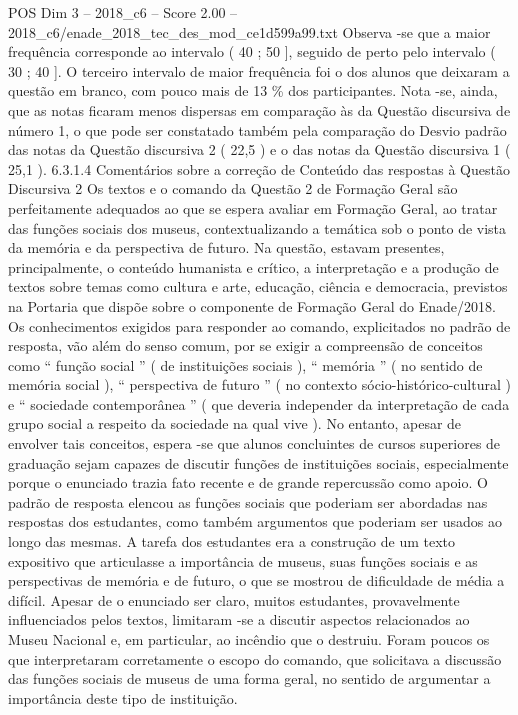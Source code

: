 \begin{textsample}{POS Dim 3 – 2018\_c6 – Score 2.00 – 2018\_c6/enade\_2018\_tec\_des\_mod\_ce1d599a99.txt}
Observa -se que a maior frequência corresponde ao intervalo ( 40 ; 50 ], seguido de perto pelo intervalo ( 30 ; 40 ].
O terceiro intervalo de maior frequência foi o dos alunos que deixaram a questão em branco, com pouco mais de 13 \% dos participantes.
Nota -se, ainda, que as notas ficaram menos dispersas em comparação às da Questão discursiva de número 1, o que pode ser constatado também pela comparação do Desvio padrão das notas da Questão discursiva 2 ( 22,5 ) e o das notas da Questão discursiva 1 ( 25,1 ). 6.3.1.4 Comentários sobre a correção de Conteúdo das respostas à Questão Discursiva 2 Os textos e o comando da Questão 2 de Formação Geral são perfeitamente adequados ao que se espera avaliar em Formação Geral, ao tratar das funções sociais dos museus, contextualizando a temática sob o ponto de vista da memória e da perspectiva de futuro.
Na questão, estavam presentes, principalmente, o conteúdo humanista e crítico, a interpretação e a produção de textos sobre temas como cultura e arte, educação, ciência e democracia, previstos na Portaria que dispõe sobre o componente de Formação Geral do Enade/2018.
Os conhecimentos exigidos para responder ao comando, explicitados no padrão de resposta, vão além do senso comum, por se exigir a compreensão de conceitos como “ função social ” ( de instituições sociais ), “ memória ” ( no sentido de memória social ), “ perspectiva de futuro ” ( no contexto sócio-histórico-cultural ) e “ sociedade contemporânea ” ( que deveria independer da interpretação de cada grupo social a respeito da sociedade na qual vive ).
No entanto, apesar de envolver tais conceitos, espera -se que alunos concluintes de cursos superiores de graduação sejam capazes de discutir funções de instituições sociais, especialmente porque o enunciado trazia fato recente e de grande repercussão como apoio.
O padrão de resposta elencou as funções sociais que poderiam ser abordadas nas respostas dos estudantes, como também argumentos que poderiam ser usados ao longo das mesmas.
A tarefa dos estudantes era a construção de um texto expositivo que articulasse a importância de museus, suas funções sociais e as perspectivas de memória e de futuro, o que se mostrou de dificuldade de média a difícil.
Apesar de o enunciado ser claro, muitos estudantes, provavelmente influenciados pelos textos, limitaram -se a discutir aspectos relacionados ao Museu Nacional e, em particular, ao incêndio que o destruiu.
Foram poucos os que interpretaram corretamente o escopo do comando, que solicitava a discussão das funções sociais de museus de uma forma geral, no sentido de argumentar a importância deste tipo de instituição.

\end{textsample}
